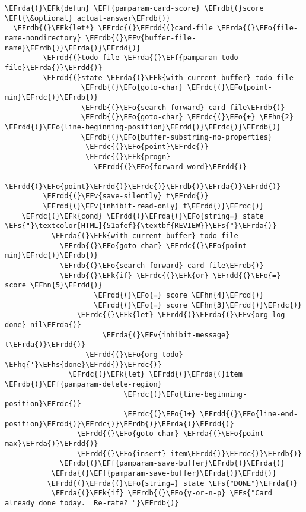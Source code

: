\documentclass[a4wide,10pt]{article}
\newcommand{\EFs}[1]{\textcolor{EFs}{#1}} %
\newcommand{\EFk}[1]{\textcolor{EFk}{#1}} %
\newcommand{\EFf}[1]{\textcolor{EFf}{#1}} %
\newcommand{\EFv}[1]{\textcolor{EFv}{#1}} %
\newcommand{\EFt}[1]{\textcolor{EFt}{#1}} %
\newcommand{\EFo}[1]{\textcolor{EFo}{#1}} %
\newcommand{\EFhn}[1]{\textcolor{EFhn}{\textbf{#1}}} %
\newcommand{\EFhq}[1]{\textcolor{EFhq}{#1}} %
\newcommand{\EFhs}[1]{\textcolor{EFhs}{#1}} %
\newcommand{\EFrda}[1]{\textcolor{EFrda}{#1}} %
\newcommand{\EFrdb}[1]{\textcolor{EFrdb}{#1}} %
\newcommand{\EFrdc}[1]{\textcolor{EFrdc}{#1}} %
\newcommand{\EFrdd}[1]{\textcolor{EFrdd}{#1}} %
\begin{document}
\begin{Code}
\begin{Verbatim}
\EFrda{(}\EFk{defun} \EFf{pamparam-card-score} \EFrdb{(}score \EFt{\&optional} actual-answer\EFrdb{)}
  \EFrdb{(}\EFk{let*} \EFrdc{(}\EFrdd{(}card-file \EFrda{(}\EFo{file-name-nondirectory} \EFrdb{(}\EFv{buffer-file-name}\EFrdb{)}\EFrda{)}\EFrdd{)}
         \EFrdd{(}todo-file \EFrda{(}\EFf{pamparam-todo-file}\EFrda{)}\EFrdd{)}
         \EFrdd{(}state \EFrda{(}\EFk{with-current-buffer} todo-file
                  \EFrdb{(}\EFo{goto-char} \EFrdc{(}\EFo{point-min}\EFrdc{)}\EFrdb{)}
                  \EFrdb{(}\EFo{search-forward} card-file\EFrdb{)}
                  \EFrdb{(}\EFo{goto-char} \EFrdc{(}\EFo{+} \EFhn{2} \EFrdd{(}\EFo{line-beginning-position}\EFrdd{)}\EFrdc{)}\EFrdb{)}
                  \EFrdb{(}\EFo{buffer-substring-no-properties}
                   \EFrdc{(}\EFo{point}\EFrdc{)}
                   \EFrdc{(}\EFk{progn}
                     \EFrdd{(}\EFo{forward-word}\EFrdd{)}
                     \EFrdd{(}\EFo{point}\EFrdd{)}\EFrdc{)}\EFrdb{)}\EFrda{)}\EFrdd{)}
         \EFrdd{(}\EFv{save-silently} t\EFrdd{)}
         \EFrdd{(}\EFv{inhibit-read-only} t\EFrdd{)}\EFrdc{)}
    \EFrdc{(}\EFk{cond} \EFrdd{(}\EFrda{(}\EFo{string=} state \EFs{"}\textcolor[HTML]{51afef}{\textbf{REVIEW}}\EFs{"}\EFrda{)}
           \EFrda{(}\EFk{with-current-buffer} todo-file
             \EFrdb{(}\EFo{goto-char} \EFrdc{(}\EFo{point-min}\EFrdc{)}\EFrdb{)}
             \EFrdb{(}\EFo{search-forward} card-file\EFrdb{)}
             \EFrdb{(}\EFk{if} \EFrdc{(}\EFk{or} \EFrdd{(}\EFo{=} score \EFhn{5}\EFrdd{)}
                     \EFrdd{(}\EFo{=} score \EFhn{4}\EFrdd{)}
                     \EFrdd{(}\EFo{=} score \EFhn{3}\EFrdd{)}\EFrdc{)}
                 \EFrdc{(}\EFk{let} \EFrdd{(}\EFrda{(}\EFv{org-log-done} nil\EFrda{)}
                       \EFrda{(}\EFv{inhibit-message} t\EFrda{)}\EFrdd{)}
                   \EFrdd{(}\EFo{org-todo} \EFhq{'}\EFhs{done}\EFrdd{)}\EFrdc{)}
               \EFrdc{(}\EFk{let} \EFrdd{(}\EFrda{(}item \EFrdb{(}\EFf{pamparam-delete-region}
                            \EFrdc{(}\EFo{line-beginning-position}\EFrdc{)}
                            \EFrdc{(}\EFo{1+} \EFrdd{(}\EFo{line-end-position}\EFrdd{)}\EFrdc{)}\EFrdb{)}\EFrda{)}\EFrdd{)}
                 \EFrdd{(}\EFo{goto-char} \EFrda{(}\EFo{point-max}\EFrda{)}\EFrdd{)}
                 \EFrdd{(}\EFo{insert} item\EFrdd{)}\EFrdc{)}\EFrdb{)}
             \EFrdb{(}\EFf{pamparam-save-buffer}\EFrdb{)}\EFrda{)}
           \EFrda{(}\EFf{pamparam-save-buffer}\EFrda{)}\EFrdd{)}
          \EFrdd{(}\EFrda{(}\EFo{string=} state \EFs{"DONE"}\EFrda{)}
           \EFrda{(}\EFk{if} \EFrdb{(}\EFo{y-or-n-p} \EFs{"Card already done today.  Re-rate? "}\EFrdb{)}

\end{Verbatim}
\end{Code}
\end{document}
